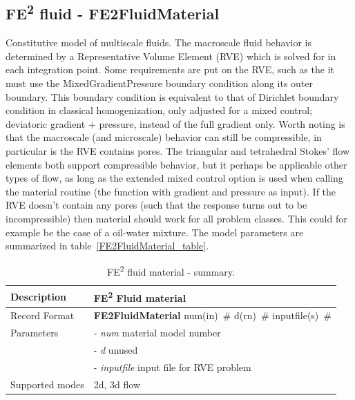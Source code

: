 \documentclass[a4paper]{article}
\newcommand{\descitem}[1]{{\noindent \bf #1}}
\newcommand{\elemparam}[2]{{{#1\tiny (#2)}~\#}}
\newcommand{\param}[1]{{\it #1}}
\begin{document}
\subsection{FE\textsuperscript{2} fluid - FE2FluidMaterial}
\label{FE2FluidMaterial}
Constitutive model of multiscale fluids.
The macroscale fluid behavior is determined by a Representative Volume Element (RVE) which is solved for in each integration point.
Some requirements are put on the RVE, such as the it must use the MixedGradientPressure boundary condition along its outer boundary. This boundary condition is equivalent to that of Dirichlet boundary condition in classical homogenization, only adjusted for a mixed control; deviatoric gradient + pressure, instead of the full gradient only.
Worth noting is that the macroscale (and microscale) behavior can still be compressible,  in particular is the RVE contains pores.
The triangular and tetrahedral Stokes' flow elements both support compressible behavior, but it perhaps be applicable other types of flow, as long as the extended mixed control option is used when calling the material routine (the function with gradient and pressure as input). If the RVE doesn't contain any pores (such that the response turns out to be incompressible) then material should work for all problem classes.
This could for example be the case of a oil-water mixture.
The model parameters are summarized in table~\ref{FE2FluidMaterial_table}.

\begin{table}[!htb]
\centering
\begin{tabular}{|l|p{9cm}|}
\hline
Description & FE\textsuperscript{2} Fluid material\\
\hline
Record Format  & \descitem{FE2FluidMaterial} \elemparam{num}{in} \elemparam{d}{rn} \elemparam{inputfile}{s}\\
Parameters &- \param{num}       material model number\\
           &- \param{d}         unused\\
           &- \param{inputfile} input file for RVE problem\\
Supported modes&  2d, 3d flow\\
\hline
\end{tabular}
\caption{FE\textsuperscript{2} fluid material - summary.}
\label{NewtonianFluidMaterial_table}
\end{table}

\clearpage
\end{document}
